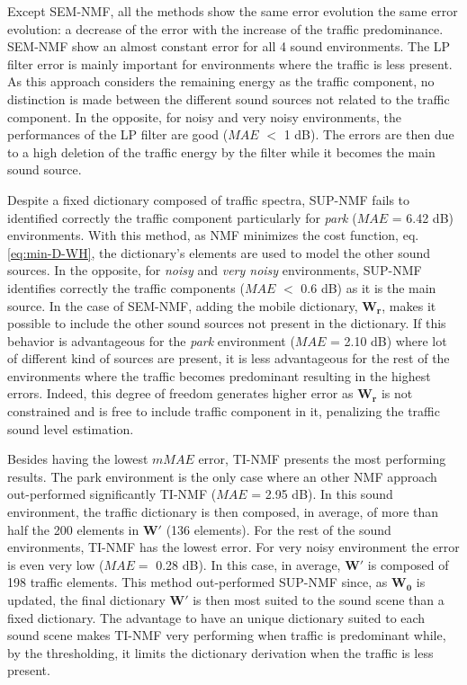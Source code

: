 \documentclass[review,5p,twocolumn,sort&compress,times]{elsarticle}
\begin{document}
Except SEM-NMF, all the methods show the same error evolution the same error evolution: a decrease of the error with the increase of the traffic predominance. SEM-NMF show an almost constant error for all 4 sound environments. The LP filter error is mainly important for environments where the traffic is less present. As this approach considers the remaining energy as the traffic component, no distinction is made between the different sound sources not related to the traffic component. In the opposite, for noisy and very noisy environments, the performances of the LP filter are good ($MAE$ $<$ 1 dB). The errors are then due to a high deletion of the traffic energy by the filter while it becomes the main sound source. 

Despite a fixed dictionary composed of traffic spectra, SUP-NMF fails to identified correctly the traffic component particularly for \textit{park} ($MAE$ = 6.42 dB) environments. With this method, as NMF minimizes the cost function, eq. \ref{eq:min-D-WH}, the dictionary's elements are used to model the other sound sources. In the opposite, for \textit{noisy} and \textit{very noisy} environments, SUP-NMF identifies correctly the traffic components ($MAE$ $<$ 0.6 dB) as it is the main source. 
In the case of SEM-NMF, adding the mobile dictionary, $\mathbf{W_r}$, makes it possible to include the other sound sources not present in the dictionary. If this behavior is advantageous for the \textit{park} environment ($MAE$ = 2.10 dB) where lot of different kind of sources are present, it is less advantageous for the rest of the environments where the traffic becomes predominant resulting in the highest errors. Indeed, this degree of freedom generates higher error as $\mathbf{W_r}$ is not constrained and is free to include traffic component in it, penalizing the traffic sound level estimation.

Besides having the lowest $mMAE$ error, TI-NMF presents the most performing results. The park environment is the only case where an other NMF approach out-performed significantly TI-NMF ($MAE$ = 2.95 dB). In this sound environment, the traffic dictionary is then composed, in average, of more than half the 200 elements in $\mathbf{W'}$ (136 elements). For the rest of the sound environments, TI-NMF has the lowest error. For very noisy environment the error is even very low ($MAE=$ 0.28 dB). In this case, in average, $\mathbf{W'}$ is composed of 198 traffic elements. This method out-performed SUP-NMF since, as $\mathbf{W_0}$ is updated, the final dictionary $\mathbf{W'}$ is then most suited to the sound scene than a fixed dictionary. The advantage to have an unique dictionary suited to each sound scene makes TI-NMF very performing when traffic is predominant while, by the thresholding, it limits the dictionary derivation when the traffic is less present.
\end{document}
